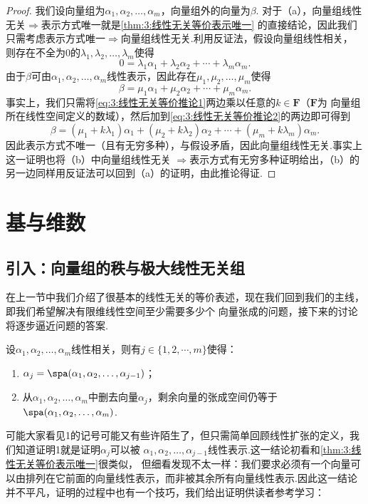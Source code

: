 \begin{enumerate}
          \begin{proof}
            我们设向量组为$\alpha_1,\alpha_2,\ldots,\alpha_m$，向量组外的向量为$\beta$.
            对于（a），向量组线性无关$\Rightarrow$表示方式唯一就是\autoref{thm:3:线性无关等价表示唯一}
            的直接结论，因此我们只需考虑表示方式唯一$\Rightarrow$向量组线性无关.利用反证法，假设向量组线性相关，
            则存在不全为0的$\lambda_1,\lambda_2,\ldots,\lambda_m$使得
            \begin{equation}\label{eq:3:线性无关等价推论1}
                0=\lambda_1\alpha_1+\lambda_2\alpha_2+\cdots+\lambda_m\alpha_m.
            \end{equation}
            由于$\beta$可由$\alpha_1,\alpha_2,\ldots,\alpha_m$线性表示，因此存在$\mu_1,\mu_2,\ldots,\mu_m$使得
            \begin{equation}\label{eq:3:线性无关等价推论2}
                \beta=\mu_1\alpha_1+\mu_2\alpha_2+\cdots+\mu_m\alpha_m.
            \end{equation}
            事实上，我们只需将\autoref{eq:3:线性无关等价推论1}两边乘以任意的$k\in\mathbf{F}$（$\mathbf{F}$为
            向量组所在线性空间定义的数域），然后加到\autoref{eq:3:线性无关等价推论2}的两边即可得到
            \[\beta=(\mu_1+k\lambda_1)\alpha_1+(\mu_2+k\lambda_2)\alpha_2+\cdots+(\mu_m+k\lambda_m)\alpha_m.\]
            因此表示方式不唯一（且有无穷多种），与假设矛盾，因此向量组线性无关.事实上这一证明也将（b）中向量组线性无关
            $\Rightarrow$表示方式有无穷多种证明给出，（b）的另一边同样用反证法可以回到（a）的证明，由此推论得证.
          \end{proof}
\end{enumerate}

\section{基与维数}
\subsection{引入：向量组的秩与极大线性无关组}
在上一节中我们介绍了很基本的线性无关的等价表述，现在我们回到我们的主线，即我们希望解决有限维线性空间至少需要多少个
向量张成的问题，接下来的讨论将逐步逼近问题的答案.
\begin{lemma}\label{lemma:3:线性相关性引理}
    设$\alpha_1,\alpha_2,\ldots,\alpha_m$线性相关，则有$j\in\{1,2,\cdots,m\}$使得：
    \begin{enumerate}
        \item $\alpha_j=\spa(\alpha_1,\alpha_2,\ldots,\alpha_{j-1})$；
        \item 从$\alpha_1,\alpha_2,\ldots,\alpha_m$中删去向量$\alpha_j$，剩余向量的张成空间仍等于
                $\spa(\alpha_1,\alpha_2,\ldots,\alpha_m)$.
    \end{enumerate}
\end{lemma}
可能大家看见1的记号可能又有些许陌生了，但只需简单回顾线性扩张的定义，我们知道证明1就是证明$\alpha_j$可以被
$\alpha_1,\alpha_2,\ldots,\alpha_{j-1}$线性表示.这一结论初看和\autoref{thm:3:线性无关等价表示唯一}很类似，
但细看发现不太一样：我们要求必须有一个向量可以由排列在它前面的向量线性表示，而非被其余所有向量线性表示.因此这一结论
并不平凡，证明的过程中也有一个技巧，我们给出证明供读者参考学习：

